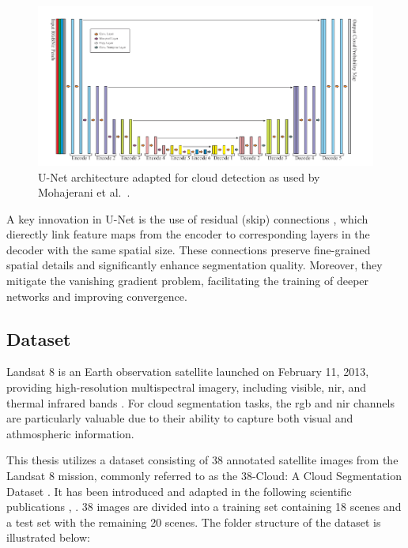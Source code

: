 {\begin{figure}[H]
  \centering
  \includegraphics[width=\textwidth]{files/U-Net_cloud_detection.png}
  \caption{U-Net architecture adapted for cloud detection as used by Mohajerani et al.~\cite{mohajerani2019cloudnet}.}
  \label{fig:unet-architecture}
\end{figure}


A key innovation in U-Net is the use of residual (skip) connections \cite{he2015deepresiduallearningimage}, which dierectly link feature maps from the encoder to corresponding layers in the decoder with the same spatial size. These connections preserve fine-grained spatial details and significantly enhance segmentation quality. Moreover, they mitigate the vanishing gradient problem, facilitating the training of deeper networks and improving convergence.

\subsection{Dataset}
\label{subsec:dataset}

Landsat 8 is an Earth observation satellite launched on February 11, 2013, providing high-resolution multispectral imagery, including visible, \gls{nir}, and thermal infrared bands \cite{landsat8}. For cloud segmentation tasks, the \gls{rgb} and \gls{nir} channels are particularly valuable due to their ability to capture both visual and athmospheric information.


This thesis utilizes a dataset consisting of 38 annotated satellite images from the Landsat 8 mission, commonly referred to as the 38-Cloud:
A Cloud Segmentation Dataset \cite{38cloud}.
It has been introduced and adapted in the following scientific publications \cite{CloudNet2019}, \cite{CloudDet2018}.
38 images are divided into a training set containing 18 scenes and a test set with the remaining 20 scenes.
The folder structure of the dataset is illustrated below:

}
